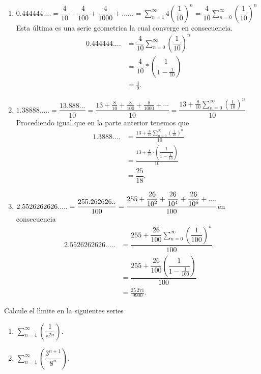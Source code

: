 \begin{sol}
\begin{enumerate}
\item $0.444444....=\dfrac{4}{10}+\dfrac{4}{100}+\dfrac{4}{1000}+......=%
{\displaystyle\sum\limits_{n=1}^{\infty}}
4\left(  \dfrac{1}{10}\right)  ^{n}=\dfrac{4}{10}%
{\displaystyle\sum\limits_{n=0}^{\infty}}
\left(  \dfrac{1}{10}\right)  ^{n}$\newline Esta \'{u}ltima es una serie
geometrica la cual converge en consecuencia.%
\begin{align*}
0.444444....  &  =\dfrac{4}{10}%
{\displaystyle\sum\limits_{n=0}^{\infty}}
\left(  \dfrac{1}{10}\right)  ^{n}\\
&  =\dfrac{4}{10}\ast\left(  \dfrac{1}{1-\frac{1}{10}}\right) \\
&  =\frac{4}{9}.
\end{align*}


\item $1.38888.....=\dfrac{13.888...}{10}=\dfrac{13+\frac{8}{10}+\frac{8}%
{100}+\frac{8}{1000}+\cdots}{10}=\dfrac{13+\frac{8}{10}\sum\limits_{n=0}%
^{\infty}\left(  \frac{1}{10}\right)  ^{n}}{10}$\newline Procediendo igual que
en la parte anterior tenemos que%
\begin{align*}
1.3888....  &  =\frac{13+\frac{8}{10}\sum\limits_{n=0}^{\infty}\left(
\frac{1}{10}\right)  ^{n}}{10}\\
&  =\frac{13+\frac{8}{10}\cdot\left(  \dfrac{1}{1-\frac{1}{10}}\right)  }%
{10}\\
&  =\dfrac{25}{18}.
\end{align*}


\item $2.5526262626.....=\dfrac{255.262626..}{100}=\dfrac{255+\dfrac
{26}{10^{2}}+\dfrac{26}{10^{4}}+\dfrac{26}{10^{6}}+....}{100}\newline$en
consecuencia
\begin{align*}
2.5526262626.....  &  =\dfrac{255+\dfrac{26}{100}%
{\displaystyle\sum\limits_{n=0}^{\infty}}
\left(  \dfrac{1}{100}\right)  ^{n}}{100}\\
&  =\dfrac{255+\dfrac{26}{100}\left(  \dfrac{1}{1-\frac{1}{100}}\right)
}{100}\\
&  =\frac{25\,271}{9900}.
\end{align*}

\end{enumerate}
\end{sol}

\begin{example}
Calcule el l\'{\i}mite en la siguientes series

\begin{enumerate}
\item $%
{\displaystyle\sum\limits_{n=1}^{\infty}}
\left(  \dfrac{1}{e^{2n}}\right)  .$

\item $%
{\displaystyle\sum\limits_{n=1}^{\infty}}
\left(  \dfrac{3^{n+1}}{8^{n}}\right)  .$
\end{enumerate}
\end{example}

